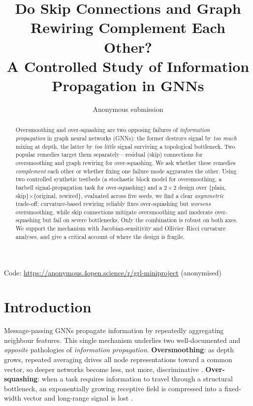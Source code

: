 \documentclass[10pt,a4paper]{article}
\title{\vspace{-1.5em}Do Skip Connections and Graph Rewiring Complement Each Other?\\
A Controlled Study of Information Propagation in GNNs}
\author{Anonymous submission}
\date{}
\begin{document}
\maketitle
\vspace{-2.5em}

\begin{center}
\small Code: \url{https://anonymous.4open.science/r/grl-miniproject} \quad(anonymised)
\end{center}
\vspace{0.5em}

\begin{abstract}
\noindent
Oversmoothing and over-squashing are two opposing failures of \emph{information
propagation} in graph neural networks (GNNs): the former destroys signal by
\emph{too much} mixing at depth, the latter by \emph{too little} signal surviving
a topological bottleneck. Two popular remedies target them separately---residual
(skip) connections for oversmoothing and graph rewiring for over-squashing. We ask
whether these remedies \emph{complement} each other or whether fixing one failure
mode aggravates the other. Using two controlled synthetic testbeds (a stochastic
block model for oversmoothing, a barbell signal-propagation task for over-squashing)
and a $2\times2$ design over \{plain, skip\}$\times$\{original, rewired\}, evaluated
across five seeds, we find a clear \emph{asymmetric} trade-off: curvature-based
rewiring reliably fixes over-squashing but \emph{worsens} oversmoothing, while skip
connections mitigate oversmoothing and moderate over-squashing but fail on severe
bottlenecks. Only the combination is robust on both axes. We support the mechanism
with Jacobian-sensitivity and Ollivier--Ricci curvature analyses, and give a critical
account of where the design is fragile.
\end{abstract}

\section{Introduction}
\label{sec:intro}

Message-passing GNNs propagate information by repeatedly aggregating neighbour
features. This single mechanism underlies two well-documented and \emph{opposite}
pathologies of \emph{information propagation}. \textbf{Oversmoothing}: as depth
grows, repeated averaging drives all node representations toward a common
vector, so deeper networks become less, not more, discriminative
\cite{li2018deeper,oono2020,rusch2023survey}. \textbf{Over-squashing}: when a task
requires information to travel through a structural bottleneck, an exponentially
growing receptive field is compressed into a fixed-width vector and long-range
signal is lost \cite{alon2021,topping2022,digiovanni2023}.
\end{document}
